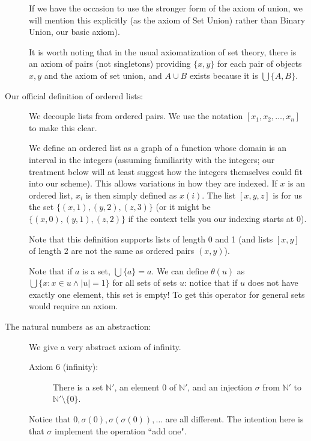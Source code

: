 \documentclass[12pt]{article}
\begin{document}
\begin{description}
If we have the occasion to use the stronger form of the axiom of union, we will mention this explicitly (as the axiom of Set Union) rather than Binary Union, our basic axiom).

It is worth noting that in the usual axiomatization of set theory, there is an axiom of pairs (not singletons) providing
$\{x,y\}$ for each pair of objects $x,y$ and the axiom of set union, and $A \cup B$ exists because it is $\bigcup \{A,B\}$.

\item[Our official definition of ordered lists:]  We decouple lists from ordered pairs.  We use the notation
$[x_1,x_2,\ldots,x_n]$ to make this clear.

We define an ordered list as a graph of a function whose domain is an interval in the integers (assuming familiarity with the integers;  our treatment below will at least suggest how the integers themselves could fit into our scheme).  This allows variations in how
they are indexed.  If $x$ is an ordered list, $x_i$ is then simply defined as $x(i)$.  The list $[x,y,z]$ is for us
the set $\{(x,1),(y,2),(z,3)\}$ (or it might be $\{(x,0),(y,1),(z,2)\}$ if the context tells you our indexing starts at 0).

Note that this definition supports lists of length 0 and 1 (and lists $[x,y]$ of length 2 are not the same as ordered pairs $(x,y)$).

Note that if $a$ is a set, $\bigcup \{a\} = a$.  We can define $\theta(u)$ as $\bigcup \{x:x \in u \wedge |u|=1\}$ for all sets of sets $u$:  notice that if $u$ does not have exactly one element, this set is empty!  To get this operator for general sets would require an axiom.

\item[The natural numbers as an abstraction:]

We give a very abstract axiom of infinity.

\begin{description}

\item[Axiom 6 (infinity):]  There is a set $\mathbb N'$, an element 0 of $\mathbb N'$, and an injection $\sigma$ from $\mathbb N'$ to $\mathbb N' \setminus \{0\}$.

\end{description}

Notice that $0, \sigma(0), \sigma(\sigma(0)),\ldots$ are all different.  The intention here is that $\sigma$ implement the operation ``add one".


\end{description}
\end{document}
